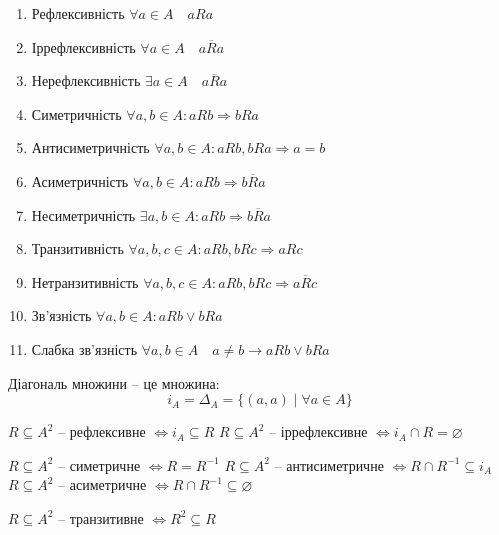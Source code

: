 \begin{enumerate}
    \item Рефлексивність $\forall a \in A \quad aRa$
    \item Іррефлексивність $\forall a \in A \quad a\overline{R}a$
    \item Нерефлексивність $\exists a \in A \quad a\overline{R}a$
    
    \item Симетричність $\forall a, b \in A: aRb \Rightarrow bRa$
    \item Антисиметричність $\forall a, b \in A: aRb, bRa \Rightarrow a = b$
    \item Асиметричність $\forall a, b \in A: aRb \Rightarrow b\overline{R}a$
    \item Несиметричність $\exists a, b \in A: aRb \Rightarrow b\overline{R}a$
    
    \item Транзитивність $\forall a, b, c \in A: aRb, bRc \Rightarrow aRc$
    \item Нетранзитивність $\forall a, b, c \in A: aRb, bRc \Rightarrow a\overline{R}c$
    
    \item Зв'язність $\forall a, b \in A: aRb \vee bRa$
    \item Слабка зв'язність $\forall a, b \in A \quad a \neq b \rightarrow aRb \vee bRa$
\end{enumerate}

\begin{definition}
    Діагональ множини -- це множина:
    $$i_A = \Delta_A = \{ (a, a) \mid \forall a \in A \}$$
\end{definition}

\begin{theorem}
    $R \subseteq A^2$ -- рефлексивне $\Leftrightarrow i_A \subseteq R$
    $R \subseteq A^2$ -- іррефлексивне $\Leftrightarrow i_A \cap R = \varnothing$
\end{theorem}

\begin{lemma}
    $R \subseteq A^2$ -- симетричне $\Leftrightarrow R = R^{-1}$
    $R \subseteq A^2$ -- антисиметричне $\Leftrightarrow R \cap R^{-1} \subseteq i_A$
    $R \subseteq A^2$ -- асиметричне $\Leftrightarrow R \cap R^{-1} \subseteq \varnothing$
\end{lemma}


\begin{theorem}
    $R \subseteq A^2$ -- транзитивне $\Leftrightarrow R^2 \subseteq R$
\end{theorem}


